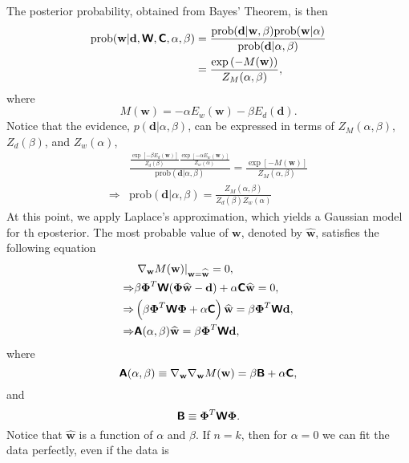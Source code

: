 \documentclass[11pt]{article}
\newcommand{\p}{\mbox{prob}}
\newcommand{\w}{\mathbf{w}}
\newcommand{\wmp}{\widehat{\mathbf{w}}}
\newcommand{\dat}{\mathbf{d}}
\def\bPhi{\boldsymbol{\Phi}}
\def\A{\boldsymbol{\sf A}}
\def\B{\boldsymbol{\sf B}}
\def\C{\boldsymbol{\sf C}}
\def\W{\boldsymbol{\sf W}}
\def\p{\mbox{prob}}
\begin{document}
\noindent
The posterior probability, obtained from Bayes' Theorem, is then
\begin{equation}
  \begin{split}
    \p(\w|\dat,\W,\C,\alpha,\beta) &= \frac{\p(\dat|\w,\beta)\p(\w|\alpha)}{\p(\dat|\alpha,\beta)}\\
    &=  \frac{\exp\left(- M(\w) \right)}{Z_M(\alpha,\beta)},
  \end{split}
\end{equation}
where
\begin{equation}
  M(\w) = -\alpha E_w(\w)-\beta E_d(\dat).
\end{equation}
Notice that the evidence, $p(\dat|\alpha,\beta)$, can be expressed in terms of 
$Z_M(\alpha,\beta)$, $Z_d(\beta)$, and $Z_w(\alpha)$,
\begin{equation}
  \begin{split}
     &\frac{\frac{\exp\left[-\beta E_d(\w)\right]}{Z_d(\beta)} \frac{\exp\left[-\alpha E_w(\w)\right]}{Z_w(\alpha)}}{\p(\dat|\alpha,\beta)} =\frac{\exp\left[-M(\w)\right]}{Z_M(\alpha,\beta)}\\
    \Rightarrow &\p(\dat|\alpha,\beta) = \frac{Z_M(\alpha,\beta)}{Z_d(\beta)Z_w(\alpha)}
  \end{split}
  \label{eq:evidence}
\end{equation}
At this point, we apply Laplace's approximation, which yields a
Gaussian model for th eposterior.  The most probable value of $\w$,
denoted by $\wmp$, satisfies the following equation
\begin{equation}
  \begin{split}
    &\left.\nabla_{\w} M(\w)\right|_{\w = \wmp}  = 0, \\
   \Rightarrow  &\beta\bPhi^T\W(\bPhi\wmp -\dat)+\alpha\C\wmp = 0,\\
    \Rightarrow &\left(\beta\bPhi^T\W\bPhi + \alpha \C\right)\wmp = \beta\bPhi^T\W\dat,\\
    \Rightarrow &\A(\alpha,\beta)\wmp = \beta\bPhi^T\W\dat,
  \end{split}
\end{equation}
where
\begin{equation}
  \A(\alpha,\beta) \equiv \nabla_{\w}\nabla_{\w}M(\w) = \beta\B + \alpha\C,
\end{equation}
and
\begin{equation}
  \B \equiv \bPhi^T\W\bPhi.
\end{equation}
Notice that $\wmp$ is a function of $\alpha$ and $\beta$. If $n=k$,
then for $\alpha=0$ we can fit the data perfectly, even if the data is
\end{document}
